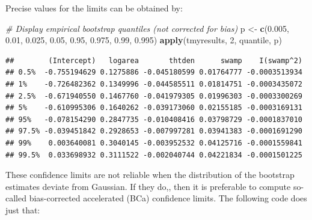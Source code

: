 \documentclass[
  12pt,
]{book}
\newenvironment{Shaded}{\begin{snugshade}}{\end{snugshade}}
\newcommand{\CommentTok}[1]{\textcolor[rgb]{0.56,0.35,0.01}{\textit{#1}}}
\newcommand{\DecValTok}[1]{\textcolor[rgb]{0.00,0.00,0.81}{#1}}
\newcommand{\FloatTok}[1]{\textcolor[rgb]{0.00,0.00,0.81}{#1}}
\newcommand{\KeywordTok}[1]{\textcolor[rgb]{0.13,0.29,0.53}{\textbf{#1}}}
\newcommand{\NormalTok}[1]{#1}
\newcommand{\StringTok}[1]{\textcolor[rgb]{0.31,0.60,0.02}{#1}}
\begin{document}
Precise values for the limits can be obtained by:

\begin{Shaded}
\begin{Highlighting}[]
\CommentTok{\# Display empirical bootstrap quantiles (not corrected for bias)}
\NormalTok{p \textless{}{-}}\StringTok{ }\KeywordTok{c}\NormalTok{(}\FloatTok{0.005}\NormalTok{, }\FloatTok{0.01}\NormalTok{, }\FloatTok{0.025}\NormalTok{, }\FloatTok{0.05}\NormalTok{, }\FloatTok{0.95}\NormalTok{, }\FloatTok{0.975}\NormalTok{, }\FloatTok{0.99}\NormalTok{, }\FloatTok{0.995}\NormalTok{)}
\KeywordTok{apply}\NormalTok{(tmyresults, }\DecValTok{2}\NormalTok{, quantile, p)}
\end{Highlighting}
\end{Shaded}

\begin{verbatim}
##        (Intercept)   logarea       thtden      swamp    I(swamp^2)
## 0.5%  -0.755194629 0.1275886 -0.045180599 0.01764777 -0.0003513934
## 1%    -0.726482362 0.1349996 -0.044585511 0.01814751 -0.0003435072
## 2.5%  -0.671940550 0.1467760 -0.041979305 0.01996303 -0.0003300269
## 5%    -0.610995306 0.1640262 -0.039173060 0.02155185 -0.0003169131
## 95%   -0.078154290 0.2847735 -0.010408416 0.03798729 -0.0001837010
## 97.5% -0.039451842 0.2928653 -0.007997281 0.03941383 -0.0001691290
## 99%    0.003640081 0.3040145 -0.003952532 0.04125716 -0.0001559841
## 99.5%  0.033698932 0.3111522 -0.002040744 0.04221834 -0.0001501225
\end{verbatim}

These confidence limits are not reliable when the distribution of the bootstrap estimates deviate from Gaussian. If they do,, then it is preferable to compute so-called bias-corrected accelerated (BCa) confidence limits. The following code does just that:
\end{document}
